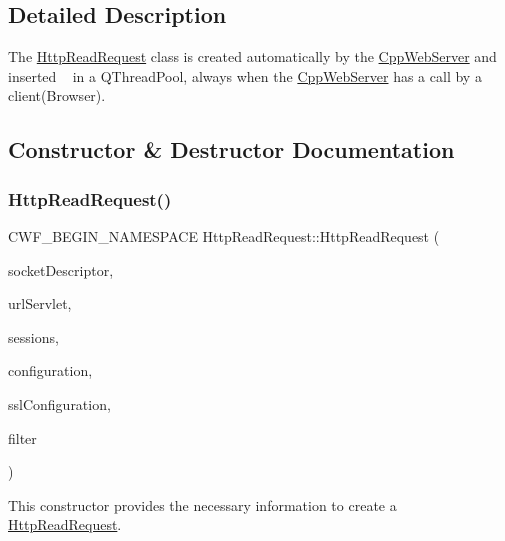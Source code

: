\subsection{Detailed Description}
The \hyperlink{class_http_read_request}{Http\+Read\+Request} class is created automatically by the \hyperlink{class_cpp_web_server}{Cpp\+Web\+Server} and inserted ~\newline
 in a Q\+Thread\+Pool, always when the \hyperlink{class_cpp_web_server}{Cpp\+Web\+Server} has a call by a client(\+Browser). 

\subsection{Constructor \& Destructor Documentation}
\mbox{\label{class_http_read_request_a640268a3a27663a31c642381a7cf03b4}} 
\subsubsection{\texorpdfstring{Http\+Read\+Request()}{HttpReadRequest()}}
{\footnotesize\ttfamily C\+W\+F\+\_\+\+B\+E\+G\+I\+N\+\_\+\+N\+A\+M\+E\+S\+P\+A\+CE Http\+Read\+Request\+::\+Http\+Read\+Request (\begin{DoxyParamCaption}\item[{qintptr}]{socket\+Descriptor,  }\item[{\hyperlink{class_q_map_thread_safety}{Q\+Map\+Thread\+Safety}$<$ Q\+String, \hyperlink{class_http_servlet}{Http\+Servlet} $\ast$$>$ \&}]{url\+Servlet,  }\item[{\hyperlink{class_q_map_thread_safety}{Q\+Map\+Thread\+Safety}$<$ Q\+String, \hyperlink{class_http_session}{Http\+Session} $\ast$$>$ \&}]{sessions,  }\item[{const \hyperlink{class_configuration}{Configuration} \&}]{configuration,  }\item[{Q\+Ssl\+Configuration $\ast$}]{ssl\+Configuration,  }\item[{\hyperlink{class_filter}{Filter} $\ast$}]{filter }\end{DoxyParamCaption})}



This constructor provides the necessary information to create a \hyperlink{class_http_read_request}{Http\+Read\+Request}. 


